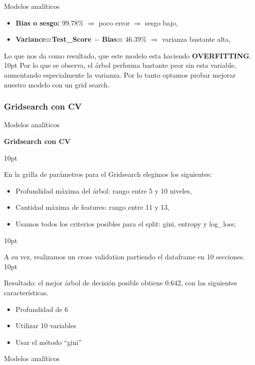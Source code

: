 \documentclass[pdf]{beamer}
\def\vspace{}%
\begin{document}
{\begin{frame}{Modelos analíticos}
    \begin{itemize}
        \item \textbf{Bias o sesgo:} 99.78\% $\Rightarrow$ poco error $\Rightarrow$ sesgo bajo,
        \item \textbf{Variance=Test\_Score $-$ Bias=} 46.39\% $\Rightarrow$ varianza bastante alta,
    \end{itemize}
    Lo que nos da como resultado, que este modelo esta haciendo \textbf{OVERFITTING}.
\vspace{10pt}
    Por lo que se observa, el árbol performa bastante peor sin esta variable, aumentando especialmente la varianza. Por lo tanto optamos probar mejorar nuestro modelo con un grid search.
\end{frame}

    \subsubsection{Gridsearch con CV}

\begin{frame}{Modelos analíticos}
    \begin{Large}
        \textbf{Gridsearch con CV}
    \end{Large}
    \vspace{10pt}
    
    En la grilla de parámetros para el Gridsearch elegimos los siguientes:
    \begin{itemize}
        \item Profundidad máxima del árbol: rango entre 5 y 10 niveles,
        \item Cantidad máxima de features: rango entre 11 y 13,
        \item Usamos todos los criterios posibles para el split: gini, entropy y log\_loss;
    \end{itemize}
    \vspace{10pt}

    A su vez, realizamos un cross validation partiendo el dataframe en 10 secciones.
    \vspace{10pt}

    Resultado: el mejor árbol de decisión posible obtiene 0.642, con las siguientes características.
    
    \begin{itemize}
        \item Profundidad de  6
        \item Utilizar  10  variables 
        \item Usar el método ``gini''
    \end{itemize}
\end{frame}
\begin{frame}{Modelos analíticos}
    

\end{frame}}
\end{document}
